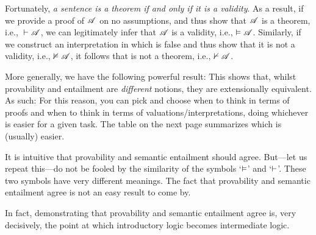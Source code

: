 Fortunately, \emph{a sentence is a theorem if and only if it is a validity}. As a result, if we provide a proof of $\mathscr{A}$ on no assumptions, and thus show that $\mathscr{A}$ is a theorem, i.e., ${}\vdash \mathscr{A}$, we can legitimately infer that $\mathscr{A}$ is a validity, i.e., $\vDash\mathscr{A}$. Similarly, if we construct an interpretation in which  is false and thus show that it is not a validity, i.e., $\nvDash \mathscr{A}$, it follows that  is not a theorem, i.e.,  $\nvdash \mathscr{A}$.

More generally, we have the following powerful result:
This shows that, whilst provability and entailment are \emph{different} notions, they are extensionally equivalent. As such:
For this reason, you can pick and choose when to think in terms of proofs and when to think in terms of valuations/interpretations, doing whichever is easier for a given task. The table on the next page summarizes which is (usually) easier.

It is intuitive that provability and semantic entailment should agree. But---let us repeat this---do not be fooled by the similarity of the symbols `$\vDash$' and `$\vdash$'. These two symbols have very different meanings. The fact that provability and semantic entailment agree is not an easy result to come by.

In fact, demonstrating that provability and semantic entailment agree is, very decisively, the point at which introductory logic becomes intermediate logic.

